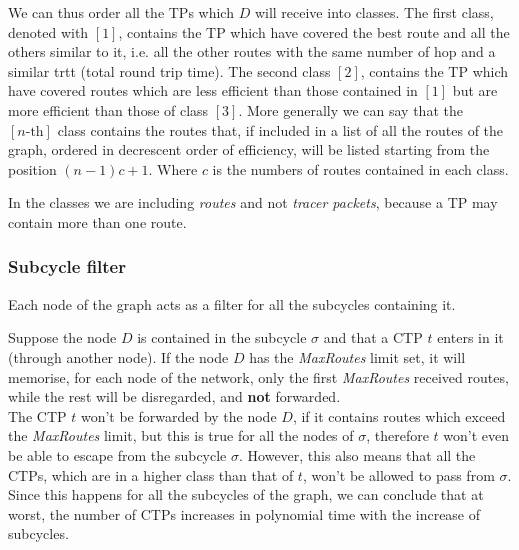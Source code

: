 \documentclass[a4paper]{article}
\begin{document}
We can thus order all the TPs which $D$ will receive into classes. The first
class, denoted with $[1]$, contains the TP which have covered the best
route and all the others similar to it, i.e. all the other routes with the same
number of hop and a similar trtt (total round trip time).
The second class $[2]$, contains the TP which have covered routes which are
less efficient than those contained in $[1]$ but are more efficient than those
of class $[3]$.
More generally we can say that the $[n\textrm{-th}]$ class contains the routes that,
if included in a list of all the routes of the graph, ordered in decrescent
order of efficiency, will be listed starting from the position $(n-1)c+1$. Where
$c$ is the numbers of routes contained in each class.

In the classes we are including \emph{routes} and not \emph{tracer packets},
because a TP may contain more than one route.

\subsubsection{Subcycle filter}
Each node of the graph acts as a filter for all the subcycles containing it.

Suppose the node $D$ is contained in the subcycle $\sigma$ and that a CTP $t$
enters in it (through another node).
If the node $D$ has the \emph{MaxRoutes} limit set, it will memorise, for each
node of the network, only the first \emph{MaxRoutes} received routes, while the
rest will be disregarded, and \textbf{not} forwarded. \\
The CTP $t$ won't be forwarded by the node $D$, if it contains routes which
exceed the \emph{MaxRoutes} limit, but this is true for all the nodes of
$\sigma$, therefore $t$ won't even be able to escape from the subcycle
$\sigma$. However, this also means that all the CTPs, which are in a higher
class than that of $t$, won't be allowed to pass from $\sigma$.\\

Since this happens for all the subcycles of the graph, we can conclude that at
worst, the number of CTPs increases in polynomial time with the increase of
subcycles.
\end{document}
